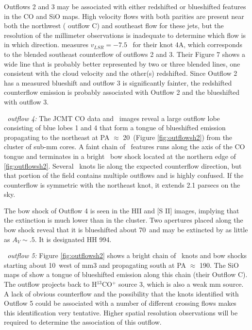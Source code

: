 Outflows 2 and 3 may be associated with either redshifted or blueshifted
features in the \citet{beuther2002} CO and SiO maps.  High velocity flows with both
parities are present near both the northwest (\citet{beuther2002} outflow C)
and southeast flow for these jets, but the resolution of the millimeter
observations is inadequate to determine which flow is in which direction.
\citet{porras2000}
measures $v_{LSR} = -7.5$ \kms\ for their knot 4A, which corresponds to the 
blended southeast counterflow of outflows 2 and 3. Their Figure 7 shows a wide 
line that is probably better represented by two or three blended lines, one
consistent with the cloud velocity and the other(s) redshifted.  Since Outflow 2
has a measured blueshift and outflow 3 is significantly fainter, the redshifted
counterflow emission is probably associated with Outflow 2 and the blueshifted
with outflow 3.

{\it \region\ outflow 4:} The JCMT CO data and \htwo\ images reveal a large
outflow lobe consisting of blue lobes 1 and 4 that form a tongue of blueshifted
emission propagating to the northeast at PA $\approx$  20\arcdeg\ (Figure
\ref{fig:outflowsh2}) from the cluster of sub-mm cores.   A faint chain of
\htwo\ features runs along the axis of the CO tongue and terminates in a bright
\htwo\ bow shock located at the northern edge of \ref{fig:outflowsh2}.   Several
\htwo\ knots lie along the expected counterflow direction, but that portion of
the field contains multiple outflows and is highly confused.  If the
counterflow is symmetric with the northeast knot, it extends 2.1 parsecs on the
sky.  

The bow shock of Outflow 4 is seen in the HII and [S II] images, implying that
the extinction is much lower than in the cluster.  Two apertures placed along
the bow shock reveal that it is blueshifted about 70\kms\ and may be extincted
by as little as $A_V\sim.5$.  It is designated HH 994.
 
{\it \region\ outflow 5:} Figure \ref{fig:outflowsh2} shows a bright chain of
\htwo\ knots and bow shocks starting about 10\arcsec\ west of mm3 and
propagating south at PA $\approx$ 190\arcdeg.  The SiO maps of
\citet{beuther2002} show a tongue of blueshifted emission along this chain
(their Outflow C).   The outflow projects back to H$^{13}$CO$^+$ source 3,
which is also a weak mm source.  A lack of obvious counterflow and the
possibility that the knots identified with Outflow 5 could be associated with a
number of different crossing flows makes this identification very tentative.
Higher spatial resolution observations will be required to determine the
association of this outflow.



